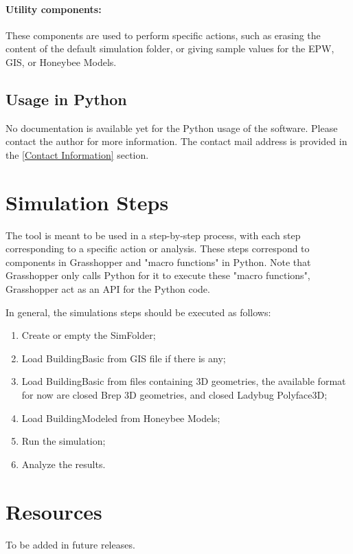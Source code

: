 \documentclass[a4paper,12pt]{article} %
\begin{document}
    \paragraph{Utility components:} These components are used to perform specific actions, such as erasing the content of the default simulation folder, or giving sample values for the EPW, GIS, or Honeybee Models.

    \subsection{Usage in Python}
    \label{subsec:usage-in-python}
    No documentation is available yet for the Python usage of the software.
    Please contact the author for more information.
    The contact mail address is provided in the \ref{Contact Information} section.

\section{Simulation Steps}
\label{sec:simulation-steps}
The tool is meant to be used in a step-by-step process, with each step corresponding to a specific action or analysis.
These steps correspond to components in Grasshopper and "macro functions" in Python.
Note that Grasshopper only calls Python for it to execute these "macro functions", Grasshopper act as an API for the Python code.

In general, the simulations steps should be executed as follows:
\begin{enumerate}
    \item Create or empty the \gls{SimFolder};
    \item Load \gls{BuildingBasic} from GIS file if there is any;
    \item Load \gls{BuildingBasic} from files containing 3D geometries, the available format for now are closed Brep 3D geometries, and closed Ladybug Polyface3D;
    \item Load \gls{BuildingModeled} from Honeybee Models;
    \item Run the simulation;
    \item Analyze the results.
\end{enumerate}


\section{Resources}
\label{sec:resources}
To be added in future releases.
\end{document}
